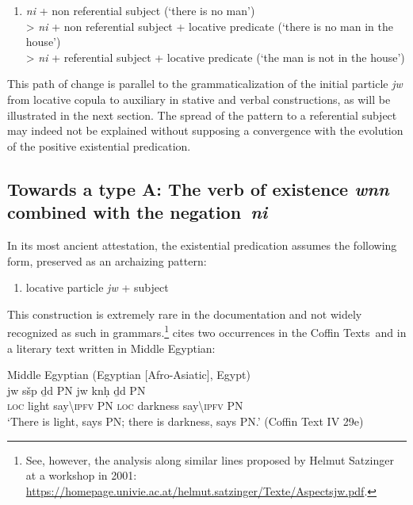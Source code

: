\documentclass[output=paper,draft,draftmode,colorlinks,citecolor=brown]{langscibook}
\begin{document}
\begin{enumerate}[label=(\roman*), resume] %
	\item \textit{ni} + non referential subject (`there is no man')\\
	> \textit{ni} + non referential subject + locative predicate (`there is no man in the house')\\
	> \textit{ni} + referential subject + locative predicate (`the man is not in the house')
\end{enumerate}

This path of change is parallel to the grammaticalization of the initial particle \textit{jw} from locative copula to auxiliary in stative and verbal constructions, as will be illustrated in the next section. The spread of the pattern to a referential subject may indeed not be explained without supposing a convergence with the evolution of the positive existential predication.

\subsection{Towards a type A: The verb of existence \textit{wnn} combined with the negation \textit{ni}}\label{s:AE2-2}

In its most ancient attestation, the existential predication assumes the following form, preserved as an archaizing pattern: 

\begin{enumerate}[label=(\roman*), resume] %
	\item locative particle \textit{jw} + subject	
\end{enumerate}

This construction is extremely rare in the documentation and not widely recognized as such in grammars.\footnote{See, however, the analysis along similar lines proposed by Helmut Satzinger at a workshop in 2001: \url{https://homepage.univie.ac.at/helmut.satzinger/Texte/Aspectsjw.pdf}.} \citet[122]{Loprieno1995} cites two occurrences in the Coffin Texts and in a literary text written in Middle Egyptian:

\ea Middle Egyptian (Egyptian [Afro-Asiatic], Egypt) \label{ex:AE14}\\
	\gll jw sšp ḏd PN jw knḥ ḏd PN\\
	\textsc{loc} light say\textbackslash\textsc{ipfv} PN \textsc{loc} darkness say\textbackslash\textsc{ipfv} PN\\
	\glt ‘There is light, says PN; there is darkness, says PN.’ (Coffin Text IV 29e)
\z 
\end{document}

